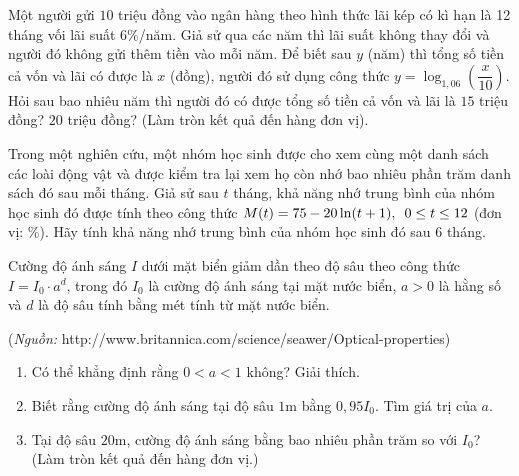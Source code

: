 \begin{bt}
	Một người gửi $10$ triệu đồng vào ngân hàng theo hình thức lãi kép có kì hạn là 12 tháng vối lãi suất $6\%$/năm. Giả sử qua các năm thì lãi suất không thay đổi và người đó không gửi thêm tiền vào mỗi năm. Để biết sau $y$ (năm) thì tổng số tiền cả vốn và lãi có được là $x$ (đồng), người đó sử dụng công thức $y=\log_{1,06}\left(\dfrac{x}{10}\right)$. Hỏi sau bao nhiêu năm thì người đó có được tổng số tiền cả vốn và lãi là $15$ triệu đồng? $20$ triệu đồng? (Làm tròn kết quả đến hàng đơn vị).
\end{bt}
\begin{bt}
	Trong một nghiên cứu, một nhóm học sinh được cho xem cùng một danh sách các loài động vật và được kiểm tra lại xem họ còn nhớ bao nhiêu phần trăm danh sách đó sau mỗi tháng. Giả sử sau $t$ tháng, khả năng nhớ trung bình của nhóm học sinh đó được tính theo công thức $M(t) = 75 - 20 \ln (t+1), \enskip 0 \leq t \leq 12$ (đơn vị: \%). Hãy tính khả năng nhớ trung bình của nhóm học sinh đó sau 6 tháng.
\end{bt}
\begin{bt}
	Cường độ ánh sáng $I$ dưới mặt biển giảm dần theo độ sâu theo công thức $I=I_0\cdot a^d$, trong đó $I_0$ là cường độ ánh sáng tại mặt nước biển, $a>0$ là hằng số và $d$ là độ sâu tính bằng mét tính từ mặt nước biển.
	\begin{center}
		(\textit{Nguồn:}  http://www.britannica.com/science/seawer/Optical-properties)
	\end{center}
	\begin{enumerate}
		\item Có thể khẳng định rằng $0<a<1$ không? Giải thích.
		\item Biết rằng cường độ ánh sáng tại độ sâu $1$m bằng $0{,}95I_0$. Tìm giá trị của $a$.
		\item Tại độ sâu $20$m, cường độ ánh sáng bằng bao nhiêu phần trăm so với $I_0$? (Làm tròn kết quả đến hàng đơn vị.)
	\end{enumerate}
\end{bt}
